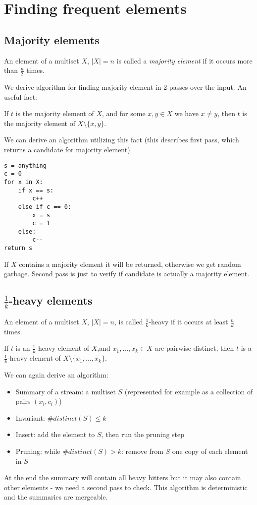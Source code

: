 \documentclass[11pt]{article}
\begin{document}

\section{Finding frequent elements}
\subsection{Majority elements \cite{DBLP:conf/birthday/Moore91}}
\begin{definition}
An element of a multiset $X$, $|X| = n$ is called a \emph{majority element} if it occurs more than $\frac{n}{2}$ times.
\end{definition}
We derive algorithm for finding majority element in 2-passes over the input. An useful fact:
\begin{lemma}
If $t$ is the majority element of $X$, and for some $x, y \in X$ we have $x \neq y$, then $t$ is the majority element of $X \setminus \{x, y\}$.
\end{lemma}
We can derive an algorithm utilizing this fact (this describes first pass, which returns a candidate for majority element).
\begin{verbatim}
s = anything
c = 0
for x in X:
    if x == s:
        c++
    else if c == 0:
        x = s
        c = 1
    else:
        c--
return s
\end{verbatim}
If $X$ contains a majority element it will be returned, otherwise we get random garbage. Second pass is just to verify if candidate is actually a majority element.
\subsection{$\frac{1}{k}$-heavy elements}
\begin{definition}
An element of a multiset $X$, $|X|=n$, is called $\frac{1}{k}$-heavy if it occurs at least $\frac{n}{k}$ times.
\end{definition}
\begin{lemma}
If $t$ is an $\frac{1}{k}$-heavy element of $X$,and $x_1, ..., x_k \in X$ are pairwise distinct, then $t$ is a $\frac{1}{k}$-heavy element of $X \setminus \{x_1, ..., x_k \}$.
\end{lemma}
We can again derive an algorithm:
\begin{itemize}
\item Summary of a stream: a multiset $S$ (represented for example as a collection of pairs $(x_i, c_i)$)
\item Invariant: $\#distinct(S) \le k$
\item Insert: add the element to $S$, then run the pruning step
\item Pruning: while $\#distinct(S) > k$: remove from $S$ one copy of each element in $S$
\end{itemize}
At the end the summary will contain all heavy hitters but it may also contain other elements - we need a second pass to check. This algorithm is deterministic and the summaries are mergeable.
\end{document}
